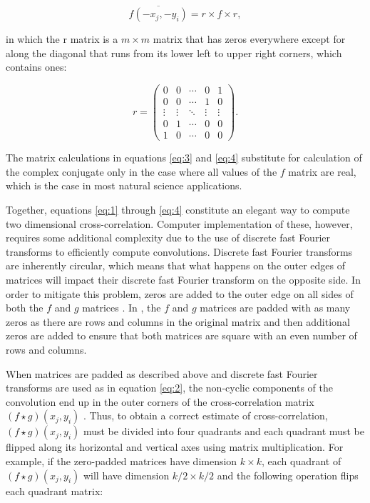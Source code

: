 \begin{equation}
\overline{f\left(-x_j, -y_i\right)} = r  \times f \times r, 
\label{eq:3}
\end{equation}

\noindent in which the r matrix is a \(m \times m\) matrix that has
zeros everywhere except for along the diagonal that runs from its lower
left to upper right corners, which contains ones:

\begin{equation}
r = 
\begin{pmatrix}
0 & 0 & \cdots & 0 & 1 \\
0 & 0 & \cdots & 1 & 0 \\
\vdots  & \vdots  & \ddots & \vdots & \vdots \\
0 & 1 & \cdots & 0 & 0\\ 
1 & 0 & \cdots & 0 & 0
\end{pmatrix}.
\label{eq:4}
\end{equation}

\noindent The matrix calculations in equations \eqref{eq:3} and \eqref{eq:4}
substitute for calculation of the complex conjugate only in the case
where all values of the \(f\) matrix are real, which is the case in most
natural science applications.

Together, equations \eqref{eq:1} through \eqref{eq:4} constitute an elegant
way to compute two dimensional cross-correlation. Computer
implementation of these, however, requires some additional complexity
due to the use of discrete fast Fourier transforms to efficiently
compute convolutions. Discrete fast Fourier transforms are inherently
circular, which means that what happens on the outer edges of matrices
will impact their discrete fast Fourier transform on the opposite side.
In order to mitigate this problem, zeros are added to the outer edge on
all sides of both the \(f\) and \(g\) matrices \citep{Anuta1970}. In
, the \(f\) and \(g\) matrices are padded with
as many zeros as there are rows and columns in the original matrix and
then additional zeros are added to ensure that both matrices are square
with an even number of rows and columns.

When matrices are padded as described above and discrete fast Fourier
transforms are used as in equation \eqref{eq:2}, the non-cyclic components
of the convolution end up in the outer corners of the cross-correlation
matrix \(\left(f \star g\right)\left(x_j, y_i\right)\)
\citep{Anuta1970}. Thus, to obtain a correct estimate of
cross-correlation, \(\left(f \star g\right)\left(x_j, y_i\right)\) must
be divided into four quadrants and each quadrant must be flipped along
its horizontal and vertical axes using matrix multiplication. For
example, if the zero-padded matrices have dimension \(k \times k\), each
quadrant of \(\left(f \star g\right)\left(x_j, y_i\right)\) will have
dimension \(k/2 \times k/2\) and the following operation flips each
quadrant matrix:

